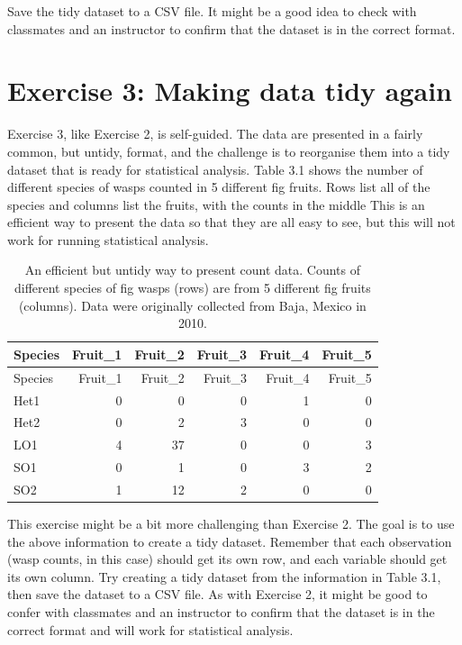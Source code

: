 \documentclass[
]{scrbook}
\begin{document}
Save the tidy dataset to a CSV file.
It might be a good idea to check with classmates and an instructor to confirm that the dataset is in the correct format.

\hypertarget{exercise-3-making-data-tidy-again}{%
\section{Exercise 3: Making data tidy again}\label{exercise-3-making-data-tidy-again}}

Exercise 3, like Exercise 2, is self-guided.
The data are presented in a fairly common, but untidy, format, and the challenge is to reorganise them into a tidy dataset that is ready for statistical analysis.
Table 3.1 shows the number of different species of wasps counted in 5 different fig fruits.
Rows list all of the species and columns list the fruits, with the counts in the middle
This is an efficient way to present the data so that they are all easy to see, but this will not work for running statistical analysis.

\begin{longtable}[]{@{}lrrrrr@{}}
\caption{\label{tab:unnamed-chunk-17}An efficient but untidy way to present count data. Counts of different species of fig wasps (rows) are from 5 different fig fruits (columns). Data were originally collected from Baja, Mexico in 2010.}\tabularnewline
\toprule
Species & Fruit\_1 & Fruit\_2 & Fruit\_3 & Fruit\_4 & Fruit\_5 \\
\midrule
\endfirsthead
\toprule
Species & Fruit\_1 & Fruit\_2 & Fruit\_3 & Fruit\_4 & Fruit\_5 \\
\midrule
\endhead
Het1 & 0 & 0 & 0 & 1 & 0 \\
Het2 & 0 & 2 & 3 & 0 & 0 \\
LO1 & 4 & 37 & 0 & 0 & 3 \\
SO1 & 0 & 1 & 0 & 3 & 2 \\
SO2 & 1 & 12 & 2 & 0 & 0 \\
\bottomrule
\end{longtable}

This exercise might be a bit more challenging than Exercise 2.
The goal is to use the above information to create a tidy dataset.
Remember that each observation (wasp counts, in this case) should get its own row, and each variable should get its own column.
Try creating a tidy dataset from the information in Table 3.1, then save the dataset to a CSV file.
As with Exercise 2, it might be good to confer with classmates and an instructor to confirm that the dataset is in the correct format and will work for statistical analysis.
\end{document}
